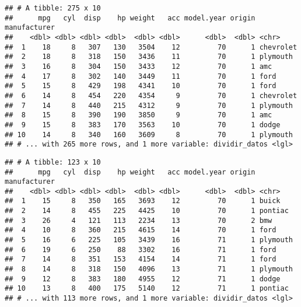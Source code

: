 \documentclass[]{article}
\newenvironment{Shaded}{\begin{snugshade}}{\end{snugshade}}
\newcommand{\DecValTok}[1]{\textcolor[rgb]{0.00,0.00,0.81}{#1}}
\newcommand{\KeywordTok}[1]{\textcolor[rgb]{0.13,0.29,0.53}{\textbf{#1}}}
\newcommand{\NormalTok}[1]{#1}
\newcommand{\OperatorTok}[1]{\textcolor[rgb]{0.81,0.36,0.00}{\textbf{#1}}}
\newcommand{\OtherTok}[1]{\textcolor[rgb]{0.56,0.35,0.01}{#1}}
\begin{document}
\begin{Shaded}
\end{Shaded}

\begin{verbatim}
## # A tibble: 275 x 10
##      mpg   cyl  disp    hp weight   acc model.year origin manufacturer
##    <dbl> <dbl> <dbl> <dbl>  <dbl> <dbl>      <dbl>  <dbl> <chr>       
##  1    18     8   307   130   3504    12         70      1 chevrolet   
##  2    18     8   318   150   3436    11         70      1 plymouth    
##  3    16     8   304   150   3433    12         70      1 amc         
##  4    17     8   302   140   3449    11         70      1 ford        
##  5    15     8   429   198   4341    10         70      1 ford        
##  6    14     8   454   220   4354     9         70      1 chevrolet   
##  7    14     8   440   215   4312     9         70      1 plymouth    
##  8    15     8   390   190   3850     9         70      1 amc         
##  9    15     8   383   170   3563    10         70      1 dodge       
## 10    14     8   340   160   3609     8         70      1 plymouth    
## # ... with 265 more rows, and 1 more variable: dividir_datos <lgl>
\end{verbatim}

\begin{Shaded}
\end{Shaded}

\begin{verbatim}
## # A tibble: 123 x 10
##      mpg   cyl  disp    hp weight   acc model.year origin manufacturer
##    <dbl> <dbl> <dbl> <dbl>  <dbl> <dbl>      <dbl>  <dbl> <chr>       
##  1    15     8   350   165   3693    12         70      1 buick       
##  2    14     8   455   225   4425    10         70      1 pontiac     
##  3    26     4   121   113   2234    13         70      2 bmw         
##  4    10     8   360   215   4615    14         70      1 ford        
##  5    16     6   225   105   3439    16         71      1 plymouth    
##  6    19     6   250    88   3302    16         71      1 ford        
##  7    14     8   351   153   4154    14         71      1 ford        
##  8    14     8   318   150   4096    13         71      1 plymouth    
##  9    12     8   383   180   4955    12         71      1 dodge       
## 10    13     8   400   175   5140    12         71      1 pontiac     
## # ... with 113 more rows, and 1 more variable: dividir_datos <lgl>
\end{verbatim}
\end{document}
